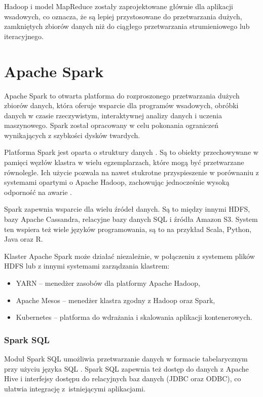 Hadoop i model MapReduce zostały zaprojektowane głównie dla aplikacji wsadowych, co oznacza,
że są lepiej przystosowane do przetwarzania dużych, zamkniętych zbiorów danych niż do ciągłego
przetwarzania strumieniowego lub iteracyjnego.

\section{Apache Spark}

Apache Spark to otwarta platforma do rozproszonego przetwarzania dużych zbiorów danych,
która oferuje wsparcie dla programów wsadowych, obróbki danych w czasie rzeczywistym,
interaktywnej analizy danych i uczenia maszynowego. Spark został opracowany w celu pokonania
ograniczeń wynikających z szybkości dysków twardych.

Platforma Spark jest oparta o struktury danych .
Są to obiekty przechowywane w pamięci węzłów klastra w wielu egzemplarzach, które mogą być
przetwarzane równolegle. Ich użycie pozwala na nawet stukrotne przyspieszenie w porównaniu z
systemami opartymi o Apache Hadoop, zachowując jednocześnie wysoką odporność na awarie \cite{big-data-3}.

Spark zapewnia wsparcie dla wielu źródeł danych. Są to między innymi HDFS, bazy Apache
Cassandra, relacyjne bazy danych SQL i źródła Amazon S3. System ten wspiera też wiele
języków programowania, są to na przykład Scala, Python, Java oraz R.

Klaster Apache Spark może działać niezależnie, w połączeniu z systemem plików HDFS lub
z innymi systemami zarządzania klastrem:
\begin{itemize}
      \item YARN -- menedżer zasobów dla platformy Apache Hadoop,
      \item Apache Mesos -- menedżer klastra zgodny z Hadoop oraz Spark,
      \item Kubernetes -- platforma do wdrażania i skalowania aplikacji kontenerowych.
\end{itemize}

\subsubsection*{Spark SQL}

Moduł Spark SQL umożliwia przetwarzanie danych w formacie tabelarycznym przy użyciu języka
SQL \cite{spark-sql}. Spark SQL zapewnia też dostęp do danych z Apache Hive i interfejsy
dostępu do relacyjnych baz danych (JDBC oraz ODBC), co ułatwia integrację z~istniejącymi
aplikacjami.

